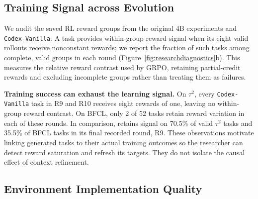 \subsection{Training Signal across Evolution}
\label{sec:analysissignal}

We audit the saved RL reward groups from the original 4B experiments and
\texttt{Codex-Vanilla}. A task provides within-group reward signal when its
eight valid rollouts receive nonconstant rewards; we report the fraction of
such tasks among complete, valid groups in each round
(Figure~\ref{fig:researchdiagnostics}b). This measures the relative reward
contrast used by GRPO, retaining partial-credit rewards and excluding
incomplete groups rather than treating them as failures.

\textbf{Training success can exhaust the learning signal.}\quad
On $\tau^2$, every \texttt{Codex-Vanilla} task in R9 and R10 receives eight
rewards of one, leaving no within-group reward contrast. On BFCL, only
2 of 52 tasks retain reward variation in each of these rounds.
In comparison, \method{} retains signal on 70.5\% of valid $\tau^2$ tasks
and 35.5\% of BFCL tasks in its final recorded round, R9.
These observations motivate linking generated tasks to their actual training
outcomes so the researcher can detect reward saturation and refresh its
targets. They do not isolate the causal effect of context refinement.

\subsection{Environment Implementation Quality}
\label{sec:analysisenvironment}

